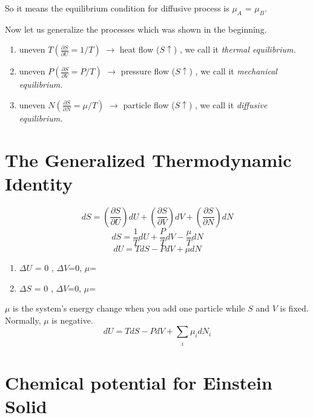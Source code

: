 So it means the equilibrium condition for diffusive process is $\mu_A$ = $\mu_B$.

Now let us generalize the processes which was shown in the beginning.
\begin{enumerate}
\item uneven $T(\frac {\partial{S}} {\partial{U}} = 1/T)  $ $\rightarrow$ heat     flow ($S\uparrow$) , we call it {\it thermal equilibrium.}
\item uneven $P(\frac {\partial{S}} {\partial{V}} = P/T)  $ $\rightarrow$ pressure flow ($S\uparrow$) , we call it {\it mechanical equilibrium.}
\item uneven $N(\frac {\partial{S}} {\partial{N}} = \mu/T)$ $\rightarrow$ particle flow ($S\uparrow$) , we call it {\it diffusive equilibrium.}
\end{enumerate}

\section{The Generalized Thermodynamic Identity}

\begin{equation} dS = (\frac{\partial S}{\partial U})dU 
                    + (\frac{\partial S}{\partial V})dV  
                    + (\frac{\partial S}{\partial N})dN 
\end{equation}
\begin{equation} dS = \frac{1}{T}dU
                    + \frac{P}{T}dV  
                    - \frac{\mu}{T}dN
\end{equation}
\begin{equation} dU = TdS - PdV  + \mu dN\end{equation}
\begin{enumerate}
\item $\Delta{U}$ = 0 , $\Delta{V}$=0, $\mu$=
\item $\Delta{S}$ = 0 , $\Delta{V}$=0, $\mu$=
\end{enumerate}
$\mu$ is the system's energy change when you add one particle while $S$ and $V$ is fixed. Normally, $\mu$ is negative.\\
\begin{equation} dU = TdS - PdV  + \sum_{\substack{i}} \mu_i dN_i\end{equation}


\section{Chemical potential for Einstein Solid}

